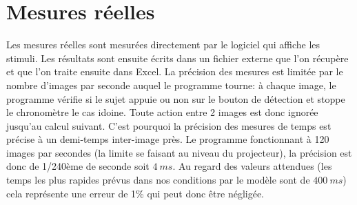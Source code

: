 	\section{Mesures réelles}
	\par Les mesures réelles sont mesurées directement par le logiciel qui affiche les stimuli. Les résultats sont ensuite écrits dans un fichier externe que l'on récupère et que l'on traite ensuite dans Excel. La précision des mesures est limitée par le nombre d'images par seconde auquel le programme tourne: à chaque image, le programme vérifie si le sujet appuie ou non sur le bouton de détection et stoppe le chronomètre le cas idoine. Toute action entre 2 images est donc ignorée jusqu'au calcul suivant. C'est pourquoi la précision des mesures de temps est précise à un demi-temps inter-image près. Le programme fonctionnant à 120 images par secondes (la limite se faisant au niveau du projecteur), la précision est donc de 1/240ème de seconde soit $4~ms$. Au regard des valeurs attendues (les temps les plus rapides prévus dans nos conditions par le modèle sont de $400~ms$) cela représente une erreur de 1\% qui peut donc être négligée.
	
